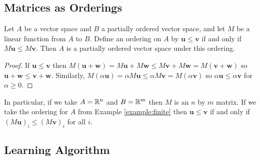 
\subsection{Matrices as Orderings}

\begin{proposition}
  Let $A$ be a vector space and $B$ a partially ordered vector space,
  and let $M$ be a linear function from $A$ to $B$. Define an ordering
  on $A$ by $\mathbf{u}\le \mathbf{v}$ if and only if $M\mathbf{u} \le M\mathbf{v}$. Then $A$ is a
  partially ordered vector space under this ordering.
\end{proposition}

\begin{proof}
If $\mathbf{u} \le \mathbf{v}$ then $M(\mathbf{u} + \mathbf{w}) = M\mathbf{u} + M\mathbf{w} \le M\mathbf{v} + M\mathbf{w} = M(\mathbf{v} + \mathbf{w})$ so $\mathbf{u} + \mathbf{w} \le \mathbf{v} + \mathbf{w}$. Similarly, $M(\alpha \mathbf{u}) = \alpha M\mathbf{u}
\le\alpha M\mathbf{v} = M(\alpha \mathbf{v})$ so $\alpha \mathbf{u} \le \alpha \mathbf{v}$ for
$\alpha \ge 0$.
\end{proof}

In particular, if we take $A = \mathbb{R}^n$ and $B = \mathbb{R}^m$ then $M$ is an $n$
by $m$ matrix. If we take the ordering for $A$ from Example
\ref{example:finite} then $\mathbf{u}\le \mathbf{v}$ if and only if $(M\mathbf{u})_i \le (M\mathbf{v})_i$
for all $i$.

\subsection{Learning Algorithm}

